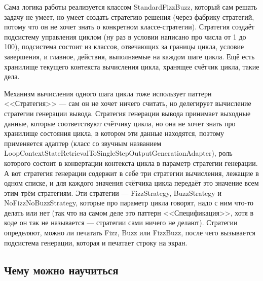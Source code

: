 \documentclass[a5paper]{article}
\begin{document}
Сама логика работы реализуется классом StandardFizzBuzz, который сам решать задачу не умеет, но умеет создать стратегию решения (через фабрику стратегий, потому что он не хочет знать о конкретном классе-стратегии). Стратегия создаёт подсистему управления циклом (ну раз в условии написано про числа от 1 до 100), подсистема состоит из классов, отвечающих за границы цикла, условие завершения, и главное, действия, выполняемые на каждом шаге цикла. Ещё есть хранилище текущего контекста вычисления цикла, хранящее счётчик цикла, такие дела.

Механизм вычисления одного шага цикла тоже использует паттерн <<Стратегия>> --- сам он не хочет ничего считать, но делегирует вычисление стратегии генерации вывода. Стратегия генерации вывода принимает выходные данные, которые соответствуют счётчику цикла, но она не хочет знать про хранилище состояния цикла, в котором эти данные находятся, поэтому применяется адаптер (класс со звучным названием LoopContextStateRetrievalToSingleStepOutputGenerationAdapter), роль которого состоит в конвертации контекста цикла в параметр стратегии генерации. А вот стратегия генерации содержит в себе три стратегии вычисления, лежащие в одном списке, и для каждого значения счётчика цикла передаёт это значение всем этим трём стратегиям. Эти стратегии --- FizzStrategy, BuzzStrategy и NoFizzNoBuzzStrategy, которые про параметр цикла говорят, надо с ним что-то делать или нет (так что на самом деле это паттерн <<Спецификация>>, хотя в коде он так не называется --- стратегии сами ничего не делают). Стратегии определяют, можно ли печатать Fizz, Buzz или FizzBuzz, после чего вызывается подсистема генерации, которая и печатает строку на экран.

\subsection{Чему можно научиться}
\end{document}
